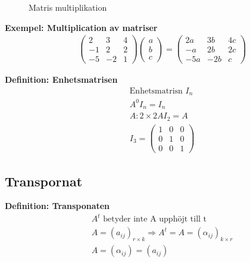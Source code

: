 \begin{multicols}{2}
\begin{figure}[H]
    \centering
    
    \caption{Matris multiplikation}
\end{figure}

\textbf{Exempel: Multiplication av matriser}
\begin{align*}
  &\quad
  \left(\begin{array}{ccc}
    2  & 3  & 4 \\
    -1 & 2  & 2 \\
    -5 & -2 & 1 
  \end{array}\right)
  \left(\begin{array}{c}
    a \\
    b \\
    c 
  \end{array}\right) =
  \left(\begin{array}{ccc}
    2a  & 3b  & 4c \\
    -a & 2b  & 2c \\
    -5a & -2b & c 
  \end{array}\right)
\end{align*}

\textbf{Definition: Enhetsmatrisen}
\begin{align*}
  &\quad  \text{Enhetsmatrisn } I_n \\
  &\quad  A^0I_n = I_n \\
  &\quad  A: 2\times{2} AI_2 = A \\
  &\quad  I_3 =
  \left(\begin{array}{ccc}
    1 & 0 & 0 \\
    0 & 1 & 0 \\
    0 & 0 & 1 
  \end{array}\right)
\end{align*}


\subsection{Transpornat}
\textbf{Definition: Transponaten}
\begin{align*}
  &\quad  A^t \text{ betyder inte A upphöjt till t} \\
  &\quad  A={(a_{ij})}_{r\times{k}} \Rightarrow A^t=A={(\alpha_{ij})}_{k\times{r}} \\
  &\quad  A={(\alpha_{ij})}={(a_{ij})}  \\
\end{align*}


\end{multicols}
